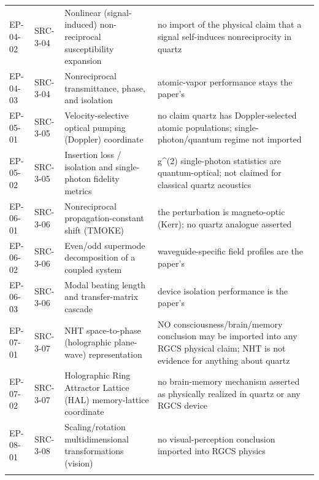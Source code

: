 \begin{landscape}
\begin{longtable}{@{}l l p{7.2cm} p{11.5cm}@{}}
EP-04-02 & SRC-3-04 & Nonlinear (signal-induced) non-reciprocal susceptibility expansion & no import of the physical claim that a signal self-induces nonreciprocity in quartz \\ \addlinespace
EP-04-03 & SRC-3-04 & Nonreciprocal transmittance, phase, and isolation & atomic-vapor performance stays the paper's \\ \addlinespace
EP-05-01 & SRC-3-05 & Velocity-selective optical pumping (Doppler) coordinate & no claim quartz has Doppler-selected atomic populations; single-photon/quantum regime not imported \\ \addlinespace
EP-05-02 & SRC-3-05 & Insertion loss / isolation and single-photon fidelity metrics & g\^{}(2) single-photon statistics are quantum-optical; not claimed for classical quartz acoustics \\ \addlinespace
EP-06-01 & SRC-3-06 & Nonreciprocal propagation-constant shift (TMOKE) & the perturbation is magneto-optic (Kerr); no quartz analogue asserted \\ \addlinespace
EP-06-02 & SRC-3-06 & Even/odd supermode decomposition of a coupled system & waveguide-specific field profiles are the paper's \\ \addlinespace
EP-06-03 & SRC-3-06 & Modal beating length and transfer-matrix cascade & device isolation performance is the paper's \\ \addlinespace
EP-07-01 & SRC-3-07 & NHT space-to-phase (holographic plane-wave) representation & NO consciousness/brain/memory conclusion may be imported into any RGCS physical claim; NHT is not evidence for anything about quartz \\ \addlinespace
EP-07-02 & SRC-3-07 & Holographic Ring Attractor Lattice (HAL) memory-lattice coordinate & no brain-memory mechanism asserted as physically realized in quartz or any RGCS device \\ \addlinespace
EP-08-01 & SRC-3-08 & Scaling/rotation multidimensional transformations (vision) & no visual-perception conclusion imported into RGCS physics \\ \addlinespace
\bottomrule
\end{longtable}
\end{landscape}
